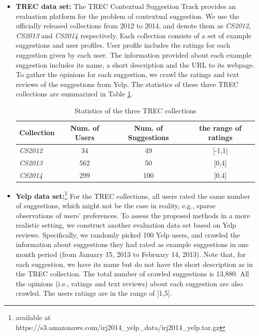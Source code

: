 \begin{itemize}
\item \textbf{TREC data set:} The TREC Contextual Suggestion Track 
\cite{adriel:overview} provides
an evaluation platform for the problem of contextual suggestion.
We use the officially released collections from 2012 to 2014,
and denote them as {\em CS2012}, {\em CS2013} and {\em CS2014} respectively.
Each collection consists of a set of example suggestions and user profiles.
User profile includes the ratings for each suggestion given by each user.
The information provided about each example suggestion includes its name,
a short description and the URL to its webpage.  To gather the opinions
for each suggestion, we crawl the ratings and text reviews of the suggestions
from Yelp.
The statistics of these three TREC collections are summarized in Table
\ref{table:trec_data_collection_summary}.

\begin{table}[t]
\centering
\caption{Statistics of the three TREC collections}
\label{table:trec_data_collection_summary}
\begin{tabular}{ lccc } \hline
Collection & Num. of Users     &  Num. of Suggestions & the range of ratings \\\hline
{\em CS2012}     & 34 & 49 & [-1,1] \\
{\em CS2013} & 562 & 50 & [0,4] \\
{\em CS2014} & 299 & 100 & [0,4] \\ \hline
\end{tabular}
\end{table}

\item \textbf{Yelp data set:}\footnote{available at https://s3.amazonaws.com/irj2014\_yelp\_data/irj2014\_yelp.tar.gz} 
For the TREC collections, all users rated the same number of suggestions, 
which might not be the case in reality, e.g., sparse observations of users' 
preferences. To assess the proposed methods in a more realistic setting, 
we construct another evaluation data set based on Yelp reviews.
Specifically, we randomly picked 100 Yelp users, and crawled the information
about suggestions they had rated as example suggestions in one month
period (from January 15, 2013 to February 14, 2013). Note that, for each
suggestion, we have its name but do not have the short description as
in the TREC collection. The total number of
crawled suggestions is 13,880. All the opinions (i.e., ratings and text reviews)
about each suggestion are also crawled. The users ratings are
in the range of [1,5].
\end{itemize}



